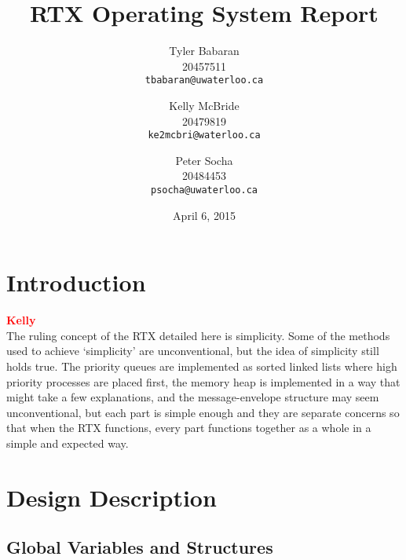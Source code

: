 \documentclass[12pt]{report}
\begin{document}
\title{RTX Operating System Report}

\author{
    Tyler Babaran\\
		20457511\\
    \texttt{tbabaran@uwaterloo.ca}
    \and
    Kelly McBride\\
		20479819\\
    \texttt{ke2mcbri@waterloo.ca}
    \and
    Peter Socha\\
		20484453\\
    \texttt{psocha@uwaterloo.ca}
}

\date{April 6, 2015}

\maketitle


\tableofcontents
\listofalgorithms
\listoffigures

\chapter{Introduction}

\textcolor{red}{\textbf{Kelly}} \\
The ruling concept of the RTX detailed here is simplicity. Some of the methods used
to achieve `simplicity' are unconventional, but the idea of simplicity still holds
true. The priority queues are implemented as sorted linked lists where high priority
processes are placed first, the memory heap is implemented in a way that might 
take a few explanations, and the message-envelope structure may seem unconventional,
but each part is simple enough and they are separate concerns so that when the RTX
functions, every part functions together as a whole in a simple and expected way.

\chapter{Design Description}

\section{Global Variables and Structures}
\end{document}
